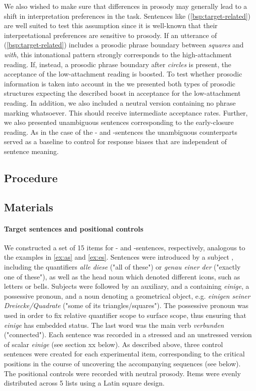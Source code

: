 \documentclass[fleqn,reqno,10pt,draft]{article}
\newcommand{\as}{\acro{as}}
\renewcommand{\es}{\acro{es}}
\begin{document}
We also wished to make sure that differences in prosody may generally
lead to a shift in interpretation preferences in the 
task. Sentences like (\ref{bsp:target-related}) are well suited to
test this assumption since it is well-known that their
interpretational preferences are sensitive to prosody. If an utterance
of (\ref{bsp:target-related}) includes a prosodic phrase boundary
between {\it squares} and {\it with}, this intonational pattern
strongly corresponds to the high-attachment reading. If, instead, a
prosodic phrase boundary after {\it circles} is present, the
acceptance of the low-attachment reading is boosted. To test whether
prosodic information is taken into account in the  we
presented both types of prosodic structures expecting the described
boost in acceptance for the low-attachment reading. In addition, we
also included a neutral version containing no phrase marking
whatsoever. This should receive intermediate acceptance
rates. Further, we also presented unambiguous sentences corresponding
to the early-closure reading. As in the case of the \as- and
\es-sentences the unambiguous counterparts served as a baseline to
control for response biases that are independent of sentence meaning.


\subsection{Procedure}
\label{sec:procedure}   

\subsection{Materials}
\label{sec:materials}


\paragraph{Target sentences and positional controls}

We constructed a set of 15 items for \as- and \es-sentences, respectively,
analogous to the examples in \ref{ex:as} and \ref{ex:es}. Sentences were
introduced by a subject {\small {}}, including the quantifiers 
{\it alle diese} ("all of these") or {\it genau einer der} ("exactly 
one of these"), as well as the head noun which denoted different icons, 
such as letters or bells. Subjects were followed by an auxiliary, and 
a {\small {}} containing {\it einige}, a possessive pronoun, and a noun denoting 
a geometrical object, e.g. {\it einigen seiner Dreiecke/Quadrate} ("some of its triangles/squares"). The possessive pronoun was used in order to fix relative 
quantifier scope to surface scope, thus ensuring that {\it einige} has 
embedded status. The last word was the main verb {\it verbunden} ("connected"). 
Each sentence was recorded  in a stressed and an unstressed version of scalar 
{\it einige} (see section xx  below). As described above, three control sentences were created 
for each experimental item, corresponding to the critical positions
in the course of uncovering the accompanying sequences (see below).
The positional controls were recorded with neutral prosody.  Items
were evenly distributed across 5 lists using a Latin square design.
\end{document}
